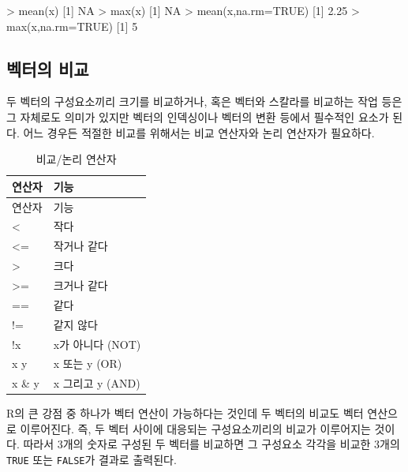 \documentclass[
]{book}
\newenvironment{Shaded}{\begin{snugshade}}{\end{snugshade}}
\newcommand{\AttributeTok}[1]{\textcolor[rgb]{0.77,0.63,0.00}{#1}}
\newcommand{\ConstantTok}[1]{\textcolor[rgb]{0.00,0.00,0.00}{#1}}
\newcommand{\DecValTok}[1]{\textcolor[rgb]{0.00,0.00,0.81}{#1}}
\newcommand{\FloatTok}[1]{\textcolor[rgb]{0.00,0.00,0.81}{#1}}
\newcommand{\FunctionTok}[1]{\textcolor[rgb]{0.00,0.00,0.00}{#1}}
\newcommand{\NormalTok}[1]{#1}
\newcommand{\SpecialCharTok}[1]{\textcolor[rgb]{0.00,0.00,0.00}{#1}}
\begin{document}
\begin{Shaded}
\begin{Highlighting}[]
\SpecialCharTok{\textgreater{}} \FunctionTok{mean}\NormalTok{(x)}
\NormalTok{[}\DecValTok{1}\NormalTok{] }\ConstantTok{NA}
\SpecialCharTok{\textgreater{}} \FunctionTok{max}\NormalTok{(x)}
\NormalTok{[}\DecValTok{1}\NormalTok{] }\ConstantTok{NA}
\SpecialCharTok{\textgreater{}} \FunctionTok{mean}\NormalTok{(x,}\AttributeTok{na.rm=}\ConstantTok{TRUE}\NormalTok{)}
\NormalTok{[}\DecValTok{1}\NormalTok{] }\FloatTok{2.25}
\SpecialCharTok{\textgreater{}} \FunctionTok{max}\NormalTok{(x,}\AttributeTok{na.rm=}\ConstantTok{TRUE}\NormalTok{)}
\NormalTok{[}\DecValTok{1}\NormalTok{] }\DecValTok{5}
\end{Highlighting}
\end{Shaded}

\hypertarget{uxbca1uxd130uxc758-uxbe44uxad50}{%
\subsection{벡터의 비교}\label{uxbca1uxd130uxc758-uxbe44uxad50}}

두 벡터의 구성요소끼리 크기를 비교하거나, 혹은 벡터와 스칼라를 비교하는 작업 등은 그
자체로도 의미가 있지만 벡터의 인덱싱이나 벡터의 변환 등에서 필수적인 요소가 된다.
어느 경우든 적절한 비교를 위해서는 비교 연산자와 논리 연산자가 필요하다.

\begin{longtable}[]{@{}ll@{}}
\caption{\label{tab:unnamed-chunk-48}비교/논리 연산자}\tabularnewline
\toprule
연산자 & 기능 \\
\midrule
\endfirsthead
\toprule
연산자 & 기능 \\
\midrule
\endhead
\textless{} & 작다 \\
\textless= & 작거나 같다 \\
\textgreater{} & 크다 \\
\textgreater= & 크거나 같다 \\
== & 같다 \\
!= & 같지 않다 \\
!x & x가 아니다 (NOT) \\
x \textbar{} y & x 또는 y (OR) \\
x \& y & x 그리고 y (AND) \\
\bottomrule
\end{longtable}

R의 큰 강점 중 하나가 벡터 연산이 가능하다는 것인데 두 벡터의 비교도 벡터 연산으
로 이루어진다. 즉, 두 벡터 사이에 대응되는 구성요소끼리의 비교가 이루어지는 것이다.
따라서 3개의 숫자로 구성된 두 벡터를 비교하면 그 구성요소 각각을 비교한 3개의 \texttt{TRUE}
또는 \texttt{FALSE}가 결과로 출력된다.
\end{document}
